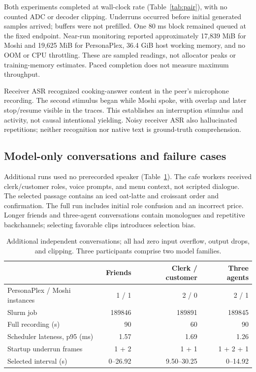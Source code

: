 \documentclass{article}
\begin{document}
Both experiments completed at wall-clock rate (Table~\ref{tab:pair}), with no counted ADC or decoder clipping. Underruns occurred before initial generated samples arrived; buffers were not prefilled. One 80 ms block remained queued at the fixed endpoint. Near-run monitoring reported approximately 17,839 MiB for Moshi and 19,625 MiB for PersonaPlex, 36.4 GiB host working memory, and no OOM or CPU throttling. These are sampled readings, not allocator peaks or training-memory estimates. Paced completion does not measure maximum throughput.

Receiver ASR recognized cooking-answer content in the peer's microphone recording. The second stimulus began while Moshi spoke, with overlap and later stop/resume visible in the traces. This establishes an interruption stimulus and activity, not causal intentional yielding. Noisy receiver ASR also hallucinated repetitions; neither recognition nor native text is ground-truth comprehension.

\subsection{Model-only conversations and failure cases}
Additional runs used no prerecorded speaker (Table~\ref{tab:showcase}). The cafe workers received clerk/customer roles, voice prompts, and menu context, not scripted dialogue. The selected passage contains an iced oat-latte and croissant order and confirmation. The full run includes initial role confusion and an incorrect price. Longer friends and three-agent conversations contain monologues and repetitive backchannels; selecting favorable clips introduces selection bias.

\begin{table}[t]
\centering
\caption{Additional independent conversations; all had zero input overflow, output drops, and clipping. Three participants comprise two model families.}
\label{tab:showcase}
\begin{tabular}{lrrr}\toprule
\rowcolor{MuCream}
 & Friends & Clerk / customer & Three agents\\\midrule
PersonaPlex / Moshi instances & 1 / 1 & 2 / 0 & 2 / 1\\
Slurm job & 189846 & 189891 & 189845\\
Full recording (s) & 90 & 60 & 90\\
Scheduler lateness, p95 (ms) & 1.57 & 1.69 & 1.26\\
Startup underrun frames & 1 + 2 & 1 + 1 & 1 + 2 + 1\\
Selected interval (s) & 0--26.92 & 9.50--30.25 & 0--14.92\\\bottomrule
\end{tabular}
\end{table}
\end{document}

